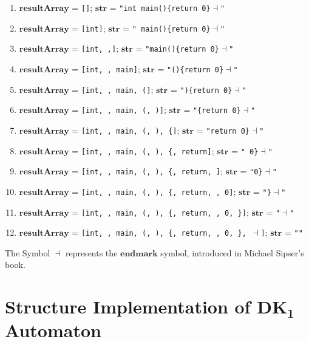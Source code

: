 \begin{enumerate}
    \item \(\boldsymbol{resultArray}\) = \texttt{[]}; \hfill \(\boldsymbol{str}\) = \texttt{"int main()\{return 0\}\( \dashv \)"}
    \item \(\boldsymbol{resultArray}\) = \texttt{[int]}; \hfill \(\boldsymbol{str}\) = \texttt{" main()\{return 0\}\( \dashv \)"}
    \item \(\boldsymbol{resultArray}\) = \texttt{[int,  ,]}; \hfill \(\boldsymbol{str}\) = \texttt{"main()\{return 0\}\( \dashv \)"}
    \item \(\boldsymbol{resultArray}\) = \texttt{[int,  , main]}; \hfill \(\boldsymbol{str}\) = \texttt{"()\{return 0\}\( \dashv \)"}
    \item \(\boldsymbol{resultArray}\) = \texttt{[int,  , main, (]}; \hfill \(\boldsymbol{str}\) = \texttt{")\{return 0\}\( \dashv \)"}
    \item \(\boldsymbol{resultArray}\) = \texttt{[int,  , main, (, )]}; \hfill \(\boldsymbol{str}\) = \texttt{"\{return 0\}\( \dashv \)"}
    \item \(\boldsymbol{resultArray}\) = \texttt{[int,  , main, (, ), \{]}; \hfill \(\boldsymbol{str}\) = \texttt{"return 0\}\( \dashv \)"}
    \item \(\boldsymbol{resultArray}\) = \texttt{[int,  , main, (, ), \{, return]}; \hfill \(\boldsymbol{str}\) = \texttt{" 0\}\( \dashv \)"}
    \item \(\boldsymbol{resultArray}\) = \texttt{[int,  , main, (, ), \{, return,  ]}; \hfill \(\boldsymbol{str}\) = \texttt{"0\}\( \dashv \)"}
    \item \(\boldsymbol{resultArray}\) = \texttt{[int,  , main, (, ), \{, return,  , 0]}; \hfill \(\boldsymbol{str}\) = \texttt{"\}\( \dashv \)"}
    \item \(\boldsymbol{resultArray}\) = \texttt{[int,  , main, (, ), \{, return,  , 0, \}]}; \hfill \(\boldsymbol{str}\) = \texttt{"\( \dashv \)"}
    \item \(\boldsymbol{resultArray}\) = \texttt{[int,  , main, (, ), \{, return,  , 0, \}, \( \dashv \)]}; \hfill \(\boldsymbol{str}\) = \texttt{""}
\end{enumerate}

The Symbol \( \dashv \) represents the \(\boldsymbol{endmark}\) symbol, introduced in Michael Sipser's book.

\newpage


\section{Structure Implementation of \(\boldsymbol{DK_{1}}\) Automaton}\label{sec:Structure Implementation of DK1 Automaton}

